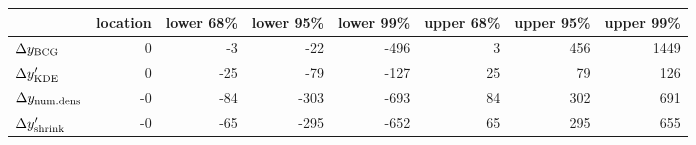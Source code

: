 \begin{tabular}{lrrrrrrr}
\toprule
{} &  location &  lower 68\% &  lower 95\% &  lower 99\% &  upper 68\% &  upper 95\% &  upper 99\% \\
\midrule
$\Delta y_{\rm BCG}$       &         0 &          -3 &         -22 &        -496 &           3 &         456 &        1449 \\
$\Delta y_{\rm KDE}'$      &         0 &         -25 &         -79 &        -127 &          25 &          79 &         126 \\
$\Delta y_{\rm num. dens}$ &        -0 &         -84 &        -303 &        -693 &          84 &         302 &         691 \\
$\Delta y_{\rm shrink}'$   &        -0 &         -65 &        -295 &        -652 &          65 &         295 &         655 \\
\bottomrule
\end{tabular}
